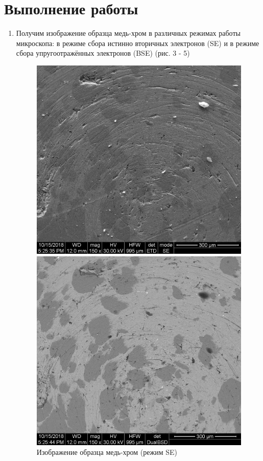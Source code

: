 \documentclass[a4paper]{article}
\begin{document}
\section{Выполнение работы}
\begin{enumerate}
    \item Получим изображение образца медь-хром в различных режимах работы микроскопа: в режиме сбора истинно вторичных электронов (SE) и в режиме сбора упругоотражённых электронов (BSE) (рис. 3 - 5)
    
    \begin{figure}[h]
\begin{center}
\begin{minipage}[h]{0.45\linewidth}
\includegraphics[width=1\linewidth]{iv1.jpg}
\caption{Изображение образца медь-хром (режим SE)} %
\end{minipage}
\hfill 
\begin{minipage}[h]{0.45\linewidth}
\includegraphics[width=1\linewidth]{z1.jpg}

\end{minipage}
\end{center}
\end{figure}
\end{enumerate}
\end{document}
